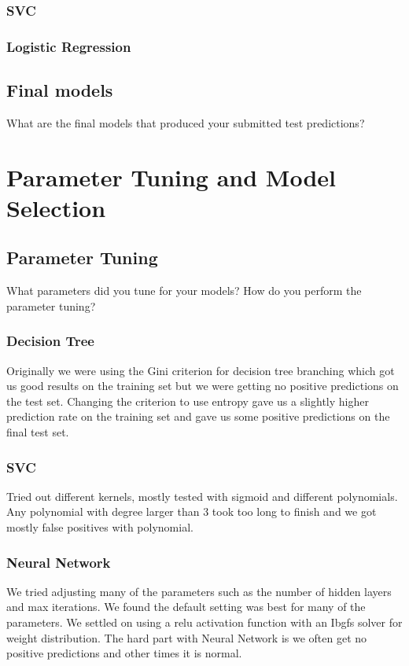 \documentclass[11pt,a4paper]{article}
\begin{document}
\subsubsection{SVC}

\subsubsection{Logistic Regression}

\subsection{Final models}
What are the final models that produced your submitted test predictions?

\section{Parameter Tuning and Model Selection }
\subsection{Parameter Tuning}
What parameters did you tune for your models? How do you perform the parameter tuning?

\subsubsection{Decision Tree}
Originally we were using the Gini criterion for decision tree branching which got us good results on the training set but we were getting no positive predictions on the test set.
Changing the criterion to use entropy gave us a slightly higher prediction rate on the training set and gave us some positive predictions on the final test set.

\subsubsection{SVC}
Tried out different kernels, mostly tested with sigmoid and different polynomials.
Any polynomial with degree larger than 3 took too long to finish and we got mostly false positives with polynomial.

\subsubsection{Neural Network}
We tried adjusting many of the parameters such as the number of hidden layers and max iterations.
We found the default setting was best for many of the parameters.
We settled on using a relu activation function with an Ibgfs solver for weight distribution.
The hard part with Neural Network is we often get no positive predictions and other times it is normal.
\end{document}
